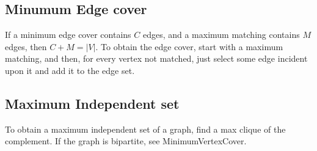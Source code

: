 	\subsection{Minumum Edge cover}
  If a minimum edge cover contains $C$ edges, and a maximum matching contains $M$ edges, then $C+M = |V|$. To obtain
  the edge cover, start with a maximum matching, and then, for every vertex not matched, just select some edge
  incident upon it and add it to the edge set.

	\subsection{Maximum Independent set}
  To obtain a maximum independent set of a graph, find a max
  clique of the complement. If the graph is bipartite, see MinimumVertexCover.
